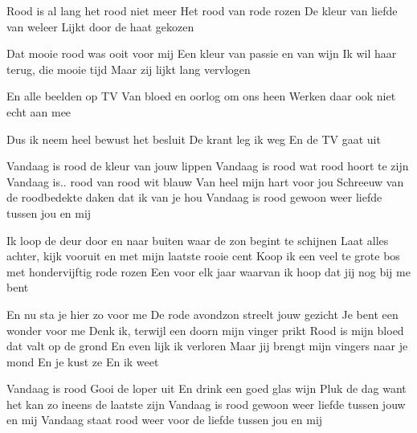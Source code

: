 \begin{verse*}
Rood is al lang het rood niet meer
Het rood van rode rozen
De kleur van liefde van weleer
Lijkt door de haat gekozen
\end{verse*}

\begin{verse*}
Dat mooie rood was ooit voor mij
Een kleur van passie en van wijn
Ik wil haar terug, die mooie tijd
Maar zij lijkt lang vervlogen
\end{verse*}

\begin{verse*}
En alle beelden op TV
Van bloed en oorlog om ons heen
Werken daar ook niet echt aan mee
\end{verse*}

\begin{verse*}
Dus ik neem heel bewust het besluit
De krant leg ik weg
En de TV gaat uit
\end{verse*}

\begin{chorus}
Vandaag is rood de kleur van jouw lippen
Vandaag is rood wat rood hoort te zijn
Vandaag is.. rood van rood wit blauw
Van heel mijn hart voor jou
Schreeuw van de roodbedekte daken dat ik van je hou
Vandaag is rood gewoon weer liefde tussen jou en mij
\end{chorus}

\begin{verse*}
Ik loop de deur door en naar buiten waar de zon begint te schijnen
Laat alles achter, kijk vooruit en met mijn laatste rooie cent
Koop ik een veel te grote bos met hondervijftig rode rozen
Een voor elk jaar waarvan ik hoop dat jij nog bij me bent
\end{verse*}

\thechorus

\begin{verse*}
En nu sta je hier zo voor me
De rode avondzon streelt jouw gezicht
Je bent een wonder voor me
Denk ik, terwijl een doorn mijn vinger prikt
Rood is mijn bloed dat valt op de grond
En even lijk ik verloren
Maar jij brengt mijn vingers naar je mond
En je kust ze
En ik weet
\end{verse*}

\thechorus

\begin{verse*}
Vandaag is rood
Gooi de loper uit
En drink een goed glas wijn
Pluk de dag want het kan zo ineens de laatste zijn
Vandaag is rood gewoon weer liefde tussen jouw en mij
Vandaag staat rood weer voor de liefde tussen jou en mij
\end{verse*}
